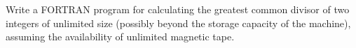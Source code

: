 Write a FORTRAN program for calculating the greatest common divisor of two integers of unlimited size (possibly beyond the storage capacity of the machine), assuming the availability of unlimited magnetic tape.
